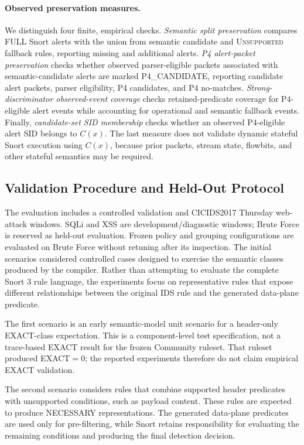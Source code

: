 \documentclass{article}
\begin{document}
\paragraph{Observed preservation measures.} We distinguish four finite,
empirical checks. \emph{Semantic split preservation} compares FULL Snort
alerts with the union from semantic candidate and \textsc{Unsupported}
fallback rules, reporting missing and additional alerts. \emph{P4
alert-packet preservation} checks whether observed parser-eligible packets
associated with semantic-candidate alerts are marked P4\_CANDIDATE, reporting
candidate alert packets, parser eligibility, P4 candidates, and P4 no-matches.
\emph{Strong-discriminator observed-event coverage} checks retained-predicate
coverage for P4-eligible alert events while accounting for operational and
semantic fallback events. Finally, \emph{candidate-set SID membership} checks
whether an observed P4-eligible alert SID belongs to $C(x)$. The last measure
does not validate dynamic stateful Snort execution using $C(x)$, because prior
packets, stream state, flowbits, and other stateful semantics may be required.

\subsection{Validation Procedure and Held-Out Protocol}
The evaluation includes a controlled validation and CICIDS2017
\cite{sharafaldin2018cicids} Thursday
web-attack windows. SQLi and XSS are development/diagnostic windows;
Brute Force is reserved as held-out evaluation. Frozen policy and grouping
configurations are evaluated on Brute Force without retuning after its
inspection. The initial scenarios
considered controlled cases designed to
exercise the semantic classes produced by the compiler. Rather than
attempting to evaluate the complete Snort 3 rule language, the
experiments focus on representative rules that expose different
relationships between the original IDS rule and the generated
data-plane predicate.

The first scenario is an early semantic-model unit scenario for a
header-only EXACT-class expectation. This is a component-level test
specification, not a trace-based EXACT result for the frozen Community ruleset.
That ruleset produced EXACT$=0$; the reported experiments therefore do not
claim empirical EXACT validation.

The second scenario considers rules that combine supported header
predicates with unsupported conditions, such as payload content. These
rules are expected to produce NECESSARY representations. The generated
data-plane predicates are used only for pre-filtering, while Snort
retains responsibility for evaluating the remaining conditions and
producing the final detection decision.
\end{document}
